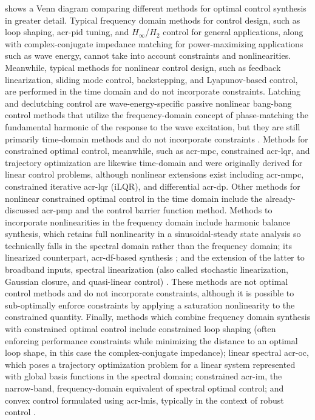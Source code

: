 \ifdefined\DISSERTATION
     shows a Venn diagram comparing different methods for optimal control synthesis in greater detail.
    Typical frequency domain methods for control design, such as loop shaping, \gls{acr-pid} tuning, and $H_\infty$/$H_2$ control for general applications, along with complex-conjugate impedance matching for power-maximizing applications such as wave energy, cannot take into account constraints and nonlinearities.
    Meanwhile, typical methods for nonlinear control design, such as feedback linearization, sliding mode control, backstepping, and Lyapunov-based control, are performed in the time domain and do not incorporate constraints.
    Latching and declutching control are wave-energy-specific passive nonlinear bang-bang control methods that utilize the frequency-domain concept of phase-matching the fundamental harmonic of the response to the wave excitation, but they are still primarily time-domain methods and do not incorporate constraints \citep{hals_comparison_2011}.
    Methods for constrained optimal control, meanwhile, such as \gls{acr-mpc}, constrained \gls{acr-lqr}, and trajectory optimization are likewise time-domain and were originally derived for linear control problems, although nonlinear extensions exist including \gls{acr-nmpc}, constrained iterative \gls{acr-lqr} (iLQR), and differential \gls{acr-dp}.
    Other methods for nonlinear constrained optimal control in the time domain include the already-discussed \gls{acr-pmp} and the control barrier function method.
    Methods to incorporate nonlinearities in the frequency domain include harmonic balance synthesis, which retains full nonlinearity in a sinusoidal-steady state analysis so technically falls in the spectral domain rather than the frequency domain; its linearized counterpart, \gls{acr-df}-based synthesis \citep{atherton_nonlinear_1982,gelb_multiple-input_1968}; and the extension of the latter to broadband inputs, spectral linearization (also called stochastic linearization, Gaussian closure, and quasi-linear control) \citep{roberts_random_2003,ching_quasilinear_2010}.
    These methods are not optimal control methods and do not incorporate constraints, although it is possible to sub-optimally enforce constraints by applying a saturation nonlinearity to the constrained quantity.
    Finally, methods which combine frequency domain synthesis with constrained optimal control include constrained loop shaping (often enforcing performance constraints while minimizing the distance to an optimal loop shape, in this case the complex-conjugate impedance); linear spectral \acrfull{acr-oc}, which poses a trajectory optimization problem for a linear system represented with global basis functions in the spectral domain; constrained \acrfull{acr-im}, the narrow-band, frequency-domain equivalent of spectral optimal control; and convex control formulated using \glspl{acr-lmi}, typically in the context of robust control \citep{vanantwerp_tutorial_2000}.

